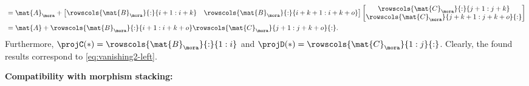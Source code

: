 \begin{example}
\begin{equation*}
\begin{aligned}
                         & =\mat{A}_\mora + \begin{bmatrix}
                                                \rowscols{\mat{B}_{\mora}}{:}{i+1:i+k} & \rowscols{\mat{B}_\mora}{:}{i+k+1:i+k+o}
                                            \end{bmatrix} \begin{bmatrix}
                                                              \rowscols{\mat{C}_{\mora}}{:}{j+1:j+k} \\
                                                              \rowscols{\mat{C}_\mora}{j+k+1:j+k+o}{:}
                                                          \end{bmatrix} \\
                         & =\mat{A}+\rowscols{\mat{B}_\mora}{:}{i+1:i+k+o}\rowscols{\mat{C}_\mora}{j+1:j+k+o}{:}.
        \end{aligned}
    \end{equation*}
    Furthermore, $\projC(\ast) = \rowscols{\mat{B}_\mora}{:}{1:i}$ and $\projD(\ast) = \rowscols{\mat{C}_\mora}{1:j}{:}$.
    Clearly, the found results correspond to \cref{eq:vanishing2-left}.

    \textbf{Compatibility with morphism stacking:}


\end{example}
